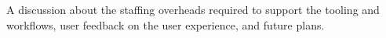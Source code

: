 A discussion about the staffing overheads required to support the tooling and workflows, user feedback on the user experience, and future plans.
